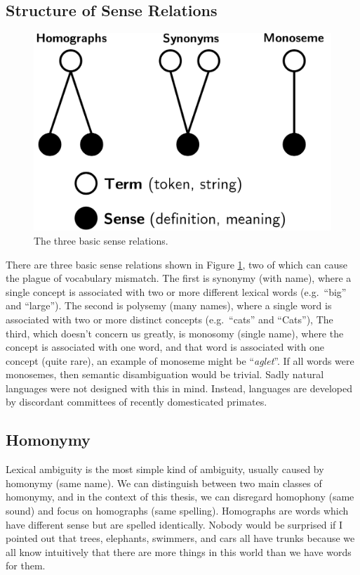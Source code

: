 \subsection{Structure of Sense Relations}

\begin{figure}[b]
    \centering
    \includegraphics[scale=0.5]{graphics/sense-relations.png}
    \caption{The three basic sense relations.}
    \label{fig:sense-relations}
\end{figure}


There are three basic sense relations shown in Figure \ref{fig:sense-relations}, two of which can cause the plague of vocabulary mismatch. The first is synonymy (with name), where a single concept is associated with two or more different lexical words (e.g.\ ``big'' and ``large''). The second is polysemy (many names), where a single word is associated with two or more distinct concepts (e.g.\ ``cats'' and ``Cats''), The third, which doesn't concern us greatly, is monosomy (single name), where the concept is associated with one word, and that word is associated with one concept (quite rare), an example of monoseme might be ``\textit{aglet}''. If all words were monosemes, then semantic disambiguation would be trivial. Sadly natural languages were not designed with this in mind. Instead, languages are developed by discordant committees of recently domesticated primates.


\subsection{Homonymy}
Lexical ambiguity is the most simple kind of ambiguity, usually caused by homonymy (same name). We can distinguish between two main classes of homonymy, and in the context of this thesis, we can disregard homophony (same sound) and focus on homographs (same spelling). Homographs are words which have different sense but are spelled identically. Nobody would be surprised if I pointed out that trees, elephants, swimmers, and cars all have trunks because we all know intuitively that there are more things in this world than we have words for them.

